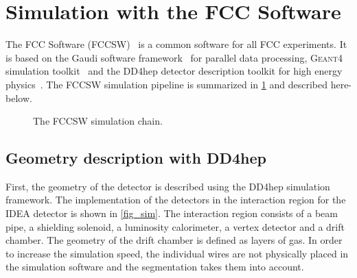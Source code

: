 \documentclass{article}
\begin{document}
\section{Simulation with the FCC Software}

The FCC Software (FCCSW)~\cite{FCCSW} is a common software for all FCC experiments. It is based on the Gaudi software framework~\cite{Gaudi} for parallel data processing, \textsc{Geant4} simulation toolkit~\cite{Geant4} and the DD4hep detector description toolkit for high energy physics~\cite{DD4hep}. The FCCSW simulation pipeline is summarized in \cref{simu_chain} and described here-below.

\begin{figure}[!h]
\centering
\caption{The FCCSW simulation chain.}
\label{simu_chain}
\end{figure}


\subsection{Geometry description with DD4hep}
First, the geometry of the detector is described using the DD4hep simulation framework. The implementation of the detectors in the interaction region for the IDEA detector is shown in \cref{fig_sim}. The interaction region consists of a beam pipe, a shielding solenoid, a luminosity calorimeter, a vertex detector and a drift chamber. The geometry of the drift chamber is defined as layers of gas. In order to increase the simulation speed, the individual wires are not physically placed in the simulation software and the segmentation takes them into account.
\end{document}
